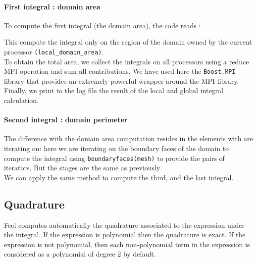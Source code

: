 \paragraph{First integral : domain area \\}
To compute the first integral (the domain area), the code reads :



This compute the integral only on the region of the domain owned by the current processor \lstinline!(local_domain_area)!. \\

To obtain the total area, we collect the integrals on all processors using a reduce MPI operation and sum all contributions. We have used here the \lstinline!Boost.MPI! library that provides an extremely powerful wrapper around the MPI library. \\


\vspace{0.2cm}
Finally, we print to the log file the result of the local and global integral calculation.


\paragraph{Second integral : domain perimeter \\}

The difference with the domain area computation resides in the elements with are iterating on: here we are iterating on the boundary faces of the domain to compute the integral using \lstinline!boundaryfaces(mesh)! to provide the pairs of iterators. But the stages are the same as previously \\



We can apply the same method to compute the third, and the last integral. \\

\subsection{Quadrature}

Feel computes automatically the quadrature associated to the expression under the integral. If the expression is polynomial then the quadrature is exact. If the expression is not polynomial, then each non-polynomial term in the expression is considered as a polynomial of degree 2 by default.

